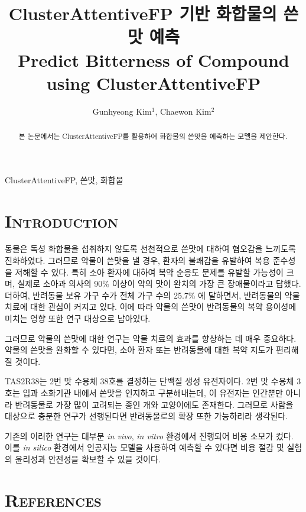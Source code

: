 \documentclass[9pt]{ieeeconf}
\title{ClusterAttentiveFP 기반 화합물의 쓴맛 예측\\
        \large Predict Bitterness of Compound using ClusterAttentiveFP}
\author{Gunhyeong Kim$^{1}$, Chaewon Kim$^{2}$}
\begin{document}
\maketitle
    \begin{abstract}
        본 논문에서는 ClusterAttentiveFP를 활용하여 화합물의 쓴맛을 예측하는 모델을 제안한다.
    \end{abstract}
    \begin{keywords}
        ClusterAttentiveFP, 쓴맛, 화합물
    \end{keywords}


\section[short]{\Large {\textsc{Introduction}}}
    
\indent 동물은 독성 화합물을 섭취하지 않도록 선천적으로 쓴맛에 대하여 혐오감을 느끼도록 진화하였다.
그러므로 약물이 쓴맛을 낼 경우, 환자의 불쾌감을 유발하여 복용 준수성을 저해할 수 있다\cite{dagan2017bitter}.
특히 소아 환자에 대하여 복약 순응도 문제를 유발할 가능성이 크며\cite{bahia2018bitterness},
실제로 소아과 의사의 90\% 이상이 약의 맛이 완치의 가장 큰 장애물이라고 답했다\cite{mennella2013bad}.
더하여, 반려동물 보유 가구 수가 전체 가구 수의 25.7\% 에 달하면서, 반려동물의 약물 치료에 대한 관심이 커지고 있다.
이에 따라 약물의 쓴맛이 반려동물의 복약 용이성에 미치는 영향 또한 연구 대상으로 남아있다.

\indent 그러므로 약물의 쓴맛에 대한 연구는 약물 치료의 효과를 향상하는 데 매우 중요하다.
약물의 쓴맛을 완화할 수 있다면, 소아 환자 또는 반려동물에 대한 복약 지도가 편리해질 것이다.

\indent TAS2R38는 2번 맛 수용체 38호를 결정하는 단백질 생성 유전자이다.
2번 맛 수용체 3호는 입과 소화기관 내에서 쓴맛을 인지하고 구분해내는데, 이 유전자는 인간뿐만 아니라 반려동물로 가장 많이 고려되는 종인 개와 고양이에도 존재한다.
그러므로 사람을 대상으로 충분한 연구가 선행된다면 반려동물로의 확장 또한 가능하리라 생각된다.

\indent 기존의 이러한 연구는 대부분 \textit{in vivo}, \textit{in vitro} 환경에서 진행되어 비용 소모가 컸다.
이를 \textit{in silico} 환경에서 인공지능 모델을 사용하여 예측할 수 있다면 비용 절감 및 실험의 윤리성과 안전성을 확보할 수 있을 것이다.


\section[short]{\Large {\textsc{References}}}


\end{document}
